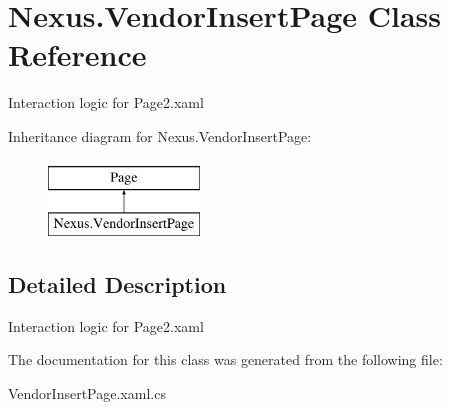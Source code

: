 \hypertarget{class_nexus_1_1_vendor_insert_page}{}\section{Nexus.\+Vendor\+Insert\+Page Class Reference}
\label{class_nexus_1_1_vendor_insert_page}


Interaction logic for Page2.\+xaml  


Inheritance diagram for Nexus.\+Vendor\+Insert\+Page\+:\begin{figure}[H]
\begin{center}
\leavevmode
\includegraphics[height=2.000000cm]{class_nexus_1_1_vendor_insert_page}
\end{center}
\end{figure}


\subsection{Detailed Description}
Interaction logic for Page2.\+xaml 



The documentation for this class was generated from the following file\+:\begin{DoxyCompactItemize}
\item 
Vendor\+Insert\+Page.\+xaml.\+cs\end{DoxyCompactItemize}
